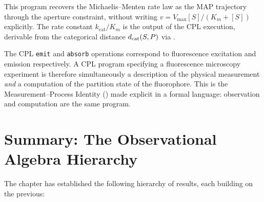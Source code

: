 This program recovers the Michaelis--Menten rate law as the MAP trajectory
through the aperture constraint, without writing $v = V_\mathrm{max}[S]/(K_m
+ [S])$ explicitly.  The rate constant $k_\mathrm{cat}/K_m$ is the output
of the CPL execution, derivable from the categorical distance $d_{\mathrm{cat}}(S,P)$
via .

\begin{remark}
The CPL \texttt{emit} and \texttt{absorb} operations correspond to
fluorescence excitation and emission respectively.  A CPL program specifying
a fluorescence microscopy experiment is therefore simultaneously a description
of the physical measurement \emph{and} a computation of the partition state
of the fluorophore.  This is the Measurement--Process Identity
() made explicit in a formal language: observation and
computation are the same program.
\end{remark}

\section{Summary: The Observational Algebra Hierarchy}
\label{sec:obs-algebra-summary}

The chapter has established the following hierarchy of results, each building
on the previous:

